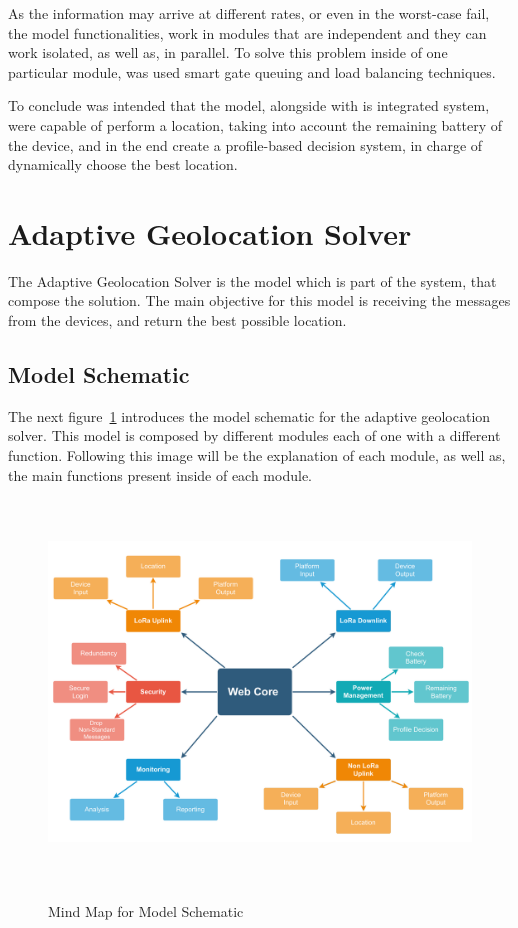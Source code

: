 As the information may arrive at different rates, or even in the worst-case fail, the model functionalities, work in modules that are independent and they can work isolated, as well as, in parallel. To solve this problem inside of one particular module, was used smart gate queuing and load balancing techniques.

To conclude was intended that the model, alongside with is integrated system, were capable of perform a location, taking into account the remaining battery of the device, and in the end create a profile-based decision system, in charge of dynamically choose the best location.





\newpage
\section{Adaptive Geolocation Solver}
The Adaptive Geolocation Solver is the model which is part of the system, that compose the solution. The main objective for this model is receiving the messages from the devices, and return the best possible location.


\label{sec:adaptive_geolocation_solver}
\subsection{Model Schematic}
The next figure~\ref{fig:Model_Schematic} introduces the model schematic for the adaptive geolocation solver.
This model is composed by different modules each of one with a different function. Following this image will be the explanation of each module, as well as, the main functions present inside of each module.

\begin{figure}[htbp]
  \centering
  
    {\includegraphics[height= 4in,width=0.92\linewidth]{Chapters/Figures/model_schematic3.pdf}}%
 
  \caption{Mind Map for Model Schematic}
  \label{fig:Model_Schematic}
\end{figure}

